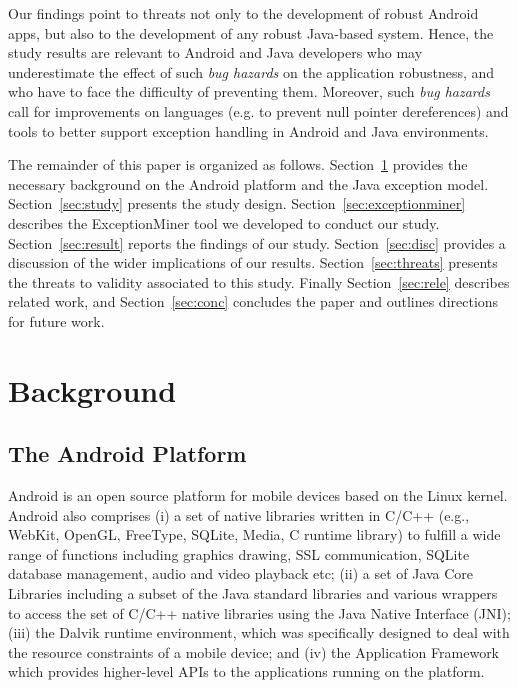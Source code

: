Our findings point to threats not only to the development of robust Android apps, 
but also to the development of any robust Java-based system. 
Hence, the study results are relevant to Android and Java developers who may underestimate the effect of such
 \emph{bug hazards} on the application robustness,
and who have to face the difficulty of preventing them.
Moreover, such \emph{bug hazards} 
call for improvements on languages (e.g. to prevent null pointer dereferences) and tools to better support exception handling in Android and Java environments.

The remainder of this paper is organized as follows. 
Section~\ref{sec:back} provides the necessary
background on the Android platform and the Java exception model. 
Section~\ref{sec:study} presents the study design. 
Section~\ref{sec:exceptionminer} describes the ExceptionMiner tool we developed to conduct our study.
Section~\ref{sec:result} reports the findings of our study.
Section~\ref{sec:disc} provides a discussion of the wider implications of our results.
Section~\ref{sec:threats} presents the threats to validity associated to this study. 
Finally Section~\ref{sec:rele} describes related work, 
and Section~\ref{sec:conc} concludes the paper and outlines
directions for future work.
\section{Background}
\label{sec:back}

\subsection{The Android Platform}
Android is an open source platform for mobile devices based on the Linux kernel.
Android also comprises (i) a set of native libraries written in C/C++ 
(e.g., WebKit, OpenGL, FreeType, SQLite, Media, C runtime library) to
fulfill a wide range of functions including graphics drawing, SSL communication, 
SQLite database management, audio and video playback etc; (ii) a set of Java Core Libraries 
including a subset of the Java standard libraries and various wrappers to access the set of C/C++ 
native libraries using the Java Native Interface (JNI); (iii) the Dalvik runtime environment, which was specifically designed to deal with the resource constraints of a mobile device; 
 and (iv) the Application Framework which provides higher-level APIs to the applications
 running on the platform.


